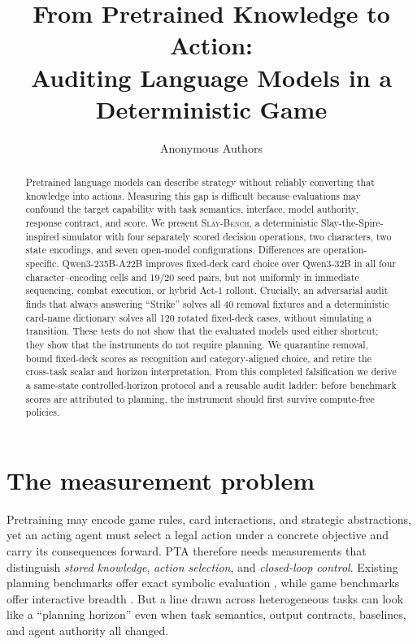 \documentclass{article}
\title{From Pretrained Knowledge to Action:\\
Auditing Language Models in a Deterministic Game}
\author{Anonymous Authors}
\newcommand{\bench}{\textsc{Slay-Bench}}
\begin{document}
\maketitle

\begin{abstract}
Pretrained language models can describe strategy without reliably converting that
knowledge into actions. Measuring this gap is difficult because evaluations may
confound the target capability with task semantics, interface, model authority,
response contract, and score. We present \bench, a deterministic
Slay-the-Spire-inspired simulator with four separately scored decision operations, two
characters, two state encodings, and seven open-model configurations. Differences are
operation-specific. Qwen3-235B-A22B improves fixed-deck card choice over Qwen3-32B in
all four character--encoding cells and 19/20 seed pairs, but not uniformly in immediate
sequencing, combat execution, or hybrid Act-1 rollout. Crucially, an adversarial audit
finds that always answering ``Strike'' solves all 40 removal fixtures and a deterministic
card-name dictionary solves all 120 rotated fixed-deck cases, without simulating a
transition. These tests do not show that the evaluated models used either shortcut;
they show that the instruments do not require planning. We quarantine removal, bound
fixed-deck scores as recognition and category-aligned choice, and retire the cross-task
scalar and horizon interpretation. From this completed falsification we derive a
same-state controlled-horizon protocol and a reusable audit ladder: before benchmark
scores are attributed to planning, the instrument should first survive compute-free
policies.
\end{abstract}

\section{The measurement problem}

Pretraining may encode game rules, card interactions, and strategic abstractions, yet
an acting agent must select a legal action under a concrete objective and carry its
consequences forward. PTA therefore needs measurements that distinguish \emph{stored
knowledge}, \emph{action selection}, and \emph{closed-loop control}. Existing planning
benchmarks offer exact symbolic evaluation \citep{valmeekam2023planbench}, while game
benchmarks offer interactive breadth \citep{costarelli2024gamebench,paglieri2025balrog}.
But a line drawn across heterogeneous tasks can look like a ``planning horizon'' even
when task semantics, output contracts, baselines, and agent authority all changed.
\end{document}

